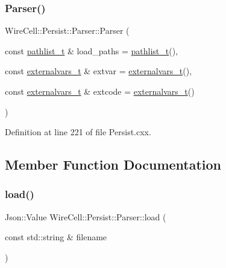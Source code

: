 \subsubsection{\texorpdfstring{Parser()}{Parser()}}
{\footnotesize\ttfamily Wire\+Cell\+::\+Persist\+::\+Parser\+::\+Parser (\begin{DoxyParamCaption}\item[{const \hyperlink{class_wire_cell_1_1_persist_1_1_parser_afb9688b844e6ea04e935a760d2de5c7a}{pathlist\+\_\+t} \&}]{load\+\_\+paths = {\ttfamily \hyperlink{class_wire_cell_1_1_persist_1_1_parser_afb9688b844e6ea04e935a760d2de5c7a}{pathlist\+\_\+t}()},  }\item[{const \hyperlink{namespace_wire_cell_1_1_persist_ae031fc57de5b5814ccd700d007bc847b}{externalvars\+\_\+t} \&}]{extvar = {\ttfamily \hyperlink{namespace_wire_cell_1_1_persist_ae031fc57de5b5814ccd700d007bc847b}{externalvars\+\_\+t}()},  }\item[{const \hyperlink{namespace_wire_cell_1_1_persist_ae031fc57de5b5814ccd700d007bc847b}{externalvars\+\_\+t} \&}]{extcode = {\ttfamily \hyperlink{namespace_wire_cell_1_1_persist_ae031fc57de5b5814ccd700d007bc847b}{externalvars\+\_\+t}()} }\end{DoxyParamCaption})}



Definition at line 221 of file Persist.\+cxx.



\subsection{Member Function Documentation}
\mbox{\label{class_wire_cell_1_1_persist_1_1_parser_ac33db035695f8fa0e800f2eb6c922ef0}} 
\subsubsection{\texorpdfstring{load()}{load()}}
{\footnotesize\ttfamily Json\+::\+Value Wire\+Cell\+::\+Persist\+::\+Parser\+::load (\begin{DoxyParamCaption}\item[{const std\+::string \&}]{filename }\end{DoxyParamCaption})}



